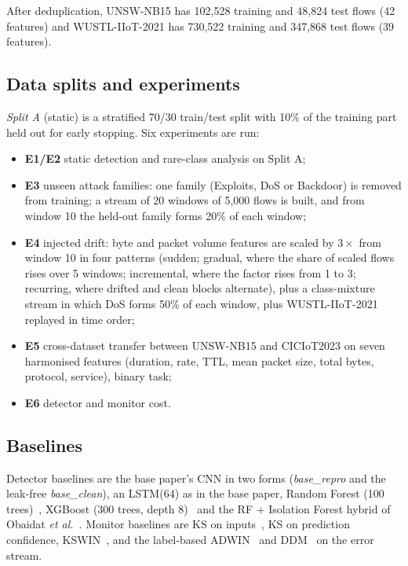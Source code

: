 \documentclass[pdflatex,sn-mathphys-num]{sn-jnl}%
\begin{document}
After deduplication, UNSW-NB15 has 102{,}528 training and 48{,}824 test flows (42 features) and WUSTL-IIoT-2021 has 730{,}522 training and 347{,}868 test flows (39 features).

\subsection{Data splits and experiments}
\textit{Split A} (static) is a stratified 70/30 train/test split with 10\% of the training part held out for early stopping. Six experiments are run:
\begin{itemize}
\item \textbf{E1/E2} static detection and rare-class analysis on Split A;
\item \textbf{E3} unseen attack families: one family (Exploits, DoS or Backdoor) is removed from training; a stream of 20 windows of 5{,}000 flows is built, and from window 10 the held-out family forms 20\% of each window;
\item \textbf{E4} injected drift: byte and packet volume features are scaled by $3\times$ from window 10 in four patterns (sudden; gradual, where the share of scaled flows rises over 5 windows; incremental, where the factor rises from 1 to 3; recurring, where drifted and clean blocks alternate), plus a class-mixture stream in which DoS forms 50\% of each window, plus WUSTL-IIoT-2021 replayed in time order;
\item \textbf{E5} cross-dataset transfer between UNSW-NB15 and CICIoT2023 on seven harmonised features (duration, rate, TTL, mean packet size, total bytes, protocol, service), binary task;
\item \textbf{E6} detector and monitor cost.
\end{itemize}

\subsection{Baselines}
Detector baselines are the base paper's CNN in two forms (\textit{base\_repro} and the leak-free \textit{base\_clean}), an LSTM(64) as in the base paper, Random Forest (100 trees)~\cite{pedregosa2011}, XGBoost (300 trees, depth 8)~\cite{chen2016xgb} and the RF + Isolation Forest hybrid of Obaidat \textit{et al.}~\cite{obaidat2026}. Monitor baselines are KS on inputs~\cite{obaidat2026}, KS on prediction confidence, KSWIN~\cite{raab2020}, and the label-based ADWIN~\cite{bifet2007} and DDM~\cite{gama2004} on the error stream.
\end{document}
